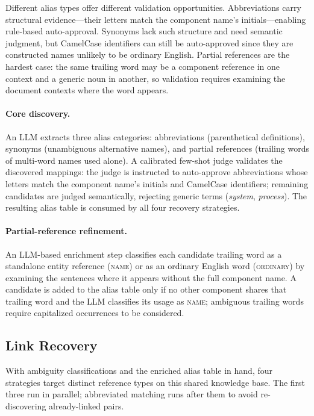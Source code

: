 Different alias types offer different validation opportunities.
Abbreviations carry structural evidence---their letters match the
component name's initials---enabling rule-based auto-approval.
Synonyms lack such structure and need semantic judgment, but
CamelCase identifiers can still be auto-approved since they are
constructed names unlikely to be ordinary English.
Partial references are the hardest case: the same trailing word may be
a component reference in one context and a generic noun in another,
so validation requires examining the document contexts where the word
appears.

\paragraph{Core discovery.}
An LLM extracts three alias categories: abbreviations
(parenthetical definitions), synonyms (unambiguous alternative
names), and partial references (trailing words of multi-word names
used alone).
A calibrated few-shot judge validates the discovered mappings:
the judge is instructed to auto-approve abbreviations whose letters
match the component name's initials and CamelCase identifiers;
remaining candidates are judged semantically, rejecting generic
terms (\emph{system}, \emph{process}).
The resulting alias table is consumed by all four recovery strategies.

\paragraph{Partial-reference refinement.}
An LLM-based enrichment step classifies each candidate trailing
word as a standalone entity reference (\textsc{name}) or as an
ordinary English word (\textsc{ordinary}) by examining the
sentences where it appears without the full component name.
A candidate is added to the alias table only if no other
component shares that trailing word and the LLM classifies
its usage as \textsc{name};
ambiguous trailing words require capitalized occurrences
to be considered.


\subsection{Link Recovery}\label{sec:recovery}

With ambiguity classifications and the enriched alias table in hand,
four strategies target distinct reference types on this shared
knowledge base.
The first three run in parallel; abbreviated matching runs after
them to avoid re-discovering already-linked pairs.

